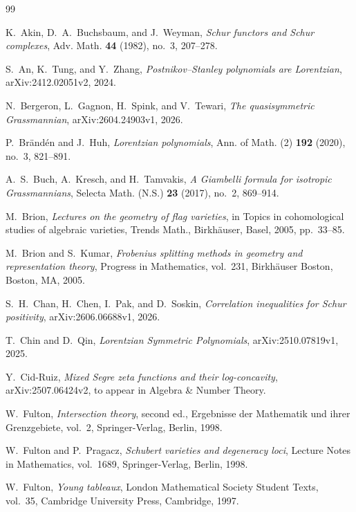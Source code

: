 \documentclass[11pt,a4paper,oneside]{amsart}
\numberwithin{equation}{section}
\theoremstyle{definition}
\theoremstyle{remark}
\begin{document}
\begin{thebibliography}{99}

K.~Akin, D.~A.~Buchsbaum, and J.~Weyman,
\emph{Schur functors and Schur complexes},
Adv. Math. \textbf{44} (1982), no.~3, 207--278.

S.~An, K.~Tung, and Y.~Zhang,
\emph{Postnikov--Stanley polynomials are Lorentzian},
arXiv:2412.02051v2, 2024.

N.~Bergeron, L.~Gagnon, H.~Spink, and V.~Tewari,
\emph{The quasisymmetric Grassmannian},
arXiv:2604.24903v1, 2026.

P.~Br\"and\'en and J.~Huh,
\emph{Lorentzian polynomials},
Ann. of Math. (2) \textbf{192} (2020), no.~3, 821--891.

A.~S.~Buch, A.~Kresch, and H.~Tamvakis,
\emph{A Giambelli formula for isotropic Grassmannians},
Selecta Math. (N.S.) \textbf{23} (2017), no.~2, 869--914.

M.~Brion,
\emph{Lectures on the geometry of flag varieties},
in Topics in cohomological studies of algebraic varieties,
Trends Math., Birkh\"auser, Basel, 2005, pp.~33--85.

M.~Brion and S.~Kumar,
\emph{Frobenius splitting methods in geometry and representation theory},
Progress in Mathematics, vol.~231, Birkh\"auser Boston, Boston, MA, 2005.

S.~H.~Chan, H.~Chen, I.~Pak, and D.~Soskin,
\emph{Correlation inequalities for Schur positivity},
arXiv:2606.06688v1, 2026.

T.~Chin and D.~Qin,
\emph{Lorentzian Symmetric Polynomials},
arXiv:2510.07819v1, 2025.

Y.~Cid-Ruiz,
\emph{Mixed Segre zeta functions and their log-concavity},
arXiv:2507.06424v2, to appear in Algebra \& Number Theory.

W.~Fulton,
\emph{Intersection theory}, second ed.,
Ergebnisse der Mathematik und ihrer Grenzgebiete, vol.~2,
Springer-Verlag, Berlin, 1998.

W.~Fulton and P.~Pragacz,
\emph{Schubert varieties and degeneracy loci},
Lecture Notes in Mathematics, vol.~1689, Springer-Verlag, Berlin, 1998.

W.~Fulton,
\emph{Young tableaux},
London Mathematical Society Student Texts, vol.~35,
Cambridge University Press, Cambridge, 1997.


\end{thebibliography}
\end{document}
